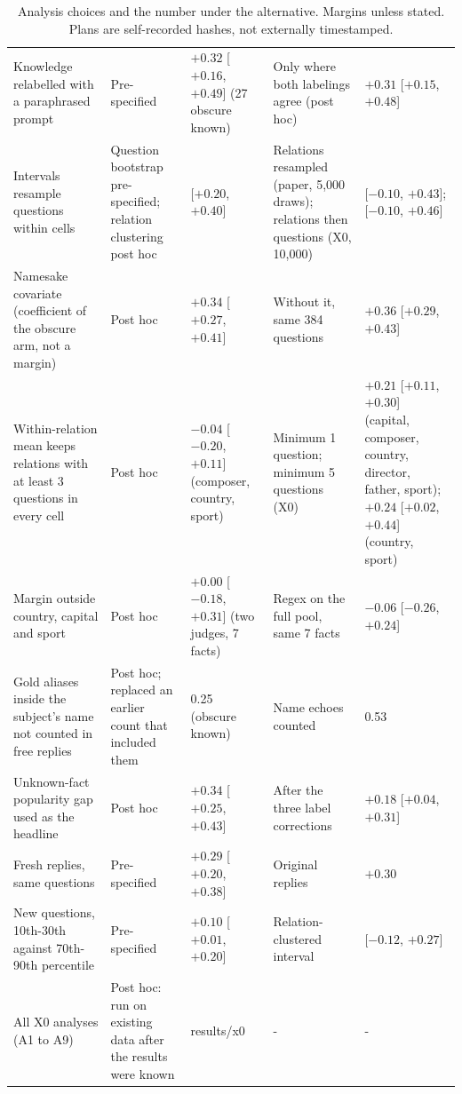 \begin{table}[h]
\begin{tabular}{p{4.4cm}p{3.2cm}p{2.5cm}p{3.0cm}p{2.5cm}}
Knowledge relabelled with a paraphrased prompt & Pre-specified & $+0.32$ [$+0.16$, $+0.49$] (27 obscure known) & Only where both labelings agree (post hoc) & $+0.31$ [$+0.15$, $+0.48$] \\
Intervals resample questions within cells & Question bootstrap pre-specified; relation clustering post hoc & [$+0.20$, $+0.40$] & Relations resampled (paper, 5,000 draws); relations then questions (X0, 10,000) & [$-0.10$, $+0.43$]; [$-0.10$, $+0.46$] \\
Namesake covariate (coefficient of the obscure arm, not a margin) & Post hoc & $+0.34$ [$+0.27$, $+0.41$] & Without it, same 384 questions & $+0.36$ [$+0.29$, $+0.43$] \\
Within-relation mean keeps relations with at least 3 questions in every cell & Post hoc & $-0.04$ [$-0.20$, $+0.11$] (composer, country, sport) & Minimum 1 question; minimum 5 questions (X0) & $+0.21$ [$+0.11$, $+0.30$] (capital, composer, country, director, father, sport); $+0.24$ [$+0.02$, $+0.44$] (country, sport) \\
Margin outside country, capital and sport & Post hoc & $+0.00$ [$-0.18$, $+0.31$] (two judges, 7 facts) & Regex on the full pool, same 7 facts & $-0.06$ [$-0.26$, $+0.24$] \\
Gold aliases inside the subject's name not counted in free replies & Post hoc; replaced an earlier count that included them & 0.25 (obscure known) & Name echoes counted & 0.53 \\
Unknown-fact popularity gap used as the headline & Post hoc & $+0.34$ [$+0.25$, $+0.43$] & After the three label corrections & $+0.18$ [$+0.04$, $+0.31$] \\
Fresh replies, same questions & Pre-specified & $+0.29$ [$+0.20$, $+0.38$] & Original replies & $+0.30$ \\
New questions, 10th-30th against 70th-90th percentile & Pre-specified & $+0.10$ [$+0.01$, $+0.20$] & Relation-clustered interval & [$-0.12$, $+0.27$] \\
All X0 analyses (A1 to A9) & Post hoc: run on existing data after the results were known & results/x0 & - & - \\
\bottomrule
\end{tabular}
\caption{Analysis choices and the number under the alternative. Margins unless stated. Plans are self-recorded hashes, not externally timestamped.}
\label{tab:x0choices}
\end{table}

